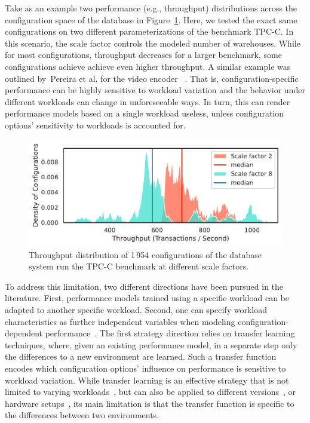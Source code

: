 {\color{edited}
Take as an example two performance (e.g., throughput) distributions across the configuration space of the database \htwo in Figure~\ref{fig:h2_intro}. Here, we tested the exact same configurations on two different parameterizations of the benchmark \textsf{TPC-C}. In this scenario, the scale factor controls the modeled number of warehouses. While for most configurations, throughput decreases for a larger benchmark, some configurations achieve achieve even higher throughput. A similar example was outlined by~Pereira et al. for the video encoder \xzwo~\cite{alves_sampling_2020}. That is, configuration-specific performance can be highly sensitive to workload variation and the behavior under different workloads can change in unforeseeable ways. In turn, this can render performance models based on a single workload useless, unless configuration options’ sensitivity to workloads is accounted for.
}
\begin{figure}
	\centering
	\includegraphics[width=0.9\linewidth]{images/h2_intro.pdf}
	\caption{Throughput distribution of 1\,954 configurations of the database system \htwo run the \textsf{TPC-C} benchmark at different scale factors.}
	\label{fig:h2_intro}
\end{figure}

To address this limitation, two different directions have been pursued in the literature. First, performance models trained using a specific workload can be adapted to another specific workload. Second,  one can specify workload characteristics as further independent variables when modeling configuration-dependent performance~\cite{koc_satune_2021}.
The first strategy direction relies on transfer learning techniques, where, given an existing performance model, in a separate step only the differences to a new environment are learned. Such a transfer function encodes which configuration options’ influence on performance is sensitive to workload variation. While transfer learning is an effective strategy that is not limited to varying workloads~\cite{jamshidi_learning_2018}, but can also be applied to different versions~\cite{jamishidi_transfer_2017,jamshidi_transfer_gp_2017,martin_transfer_2021}, or hardware setups~\cite{ding_bayesian_2020}, its main limitation is that the transfer function is specific to the differences between two environments.

